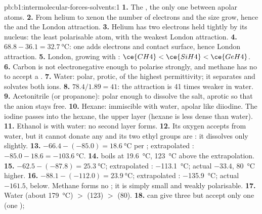 \begin{solution}{pb:b1:intermolecular-forces-solvents:1}
\textbf{1.} The , the only one between apolar atoms.
\textbf{2.} From helium to xenon the number of electrons and the size grow,
hence the  and the London attraction.
\textbf{3.} Helium has two electrons held tightly by its nucleus: the
least polarisable atom, with the weakest London attraction.
\textbf{4.} $68.8 - 36.1 = \qty{32.7}{\celsius}$: one  adds
electrons and contact surface, hence London attraction.
\textbf{5.} London, growing with : $\ce{CH4} < \ce{SiH4} <
\ce{GeH4}$.
\textbf{6.} Carbon is not electronegative enough to polarise 
strongly, and methane has no  to accept a .
\textbf{7.} Water: polar, protic, of the highest permittivity; it
separates and solvates both ions.
\textbf{8.} $78.4/1.89 = 41$: the attraction is 41 times weaker in water.
\textbf{9.} Acetonitrile (or propanone): polar enough to dissolve the salt,
aprotic so that the anion stays free.
\textbf{10.} Hexane: immiscible with water, apolar like diiodine. The iodine
passes into the hexane, the upper layer (hexane is less dense than water).
\textbf{11.} Ethanol is  with water: no second layer forms.
\textbf{12.} Its oxygen accepts  from water, but it cannot
donate any and its two ethyl groups are : it dissolves only
slightly.
\textbf{13.} $-66.4 - (-85.0) = \qty{18.6}{\celsius}$ per ;
extrapolated : $-85.0 - 18.6 = \qty{-103.6}{\celsius}$.
\textbf{14.}  boils at \qty{19.6}{\celsius}, \qty{123}{\celsius}
above the extrapolation.
\textbf{15.} $-62.5 - (-87.8) = \qty{25.3}{\celsius}$; extrapolated
: \qty{-113.1}{\celsius}; actual $-33.4$, \qty{80}{\celsius}
higher.
\textbf{16.} $-88.1 - (-112.0) = \qty{23.9}{\celsius}$; extrapolated
: \qty{-135.9}{\celsius}; actual $-161.5$, below. Methane forms no
; it is simply small and weakly polarisable.
\textbf{17.} Water (about \qty{179}{\celsius}) $>$  (123) $>$
 (80).
\textbf{18.}  can give three but accept only one (one );

\end{solution}
